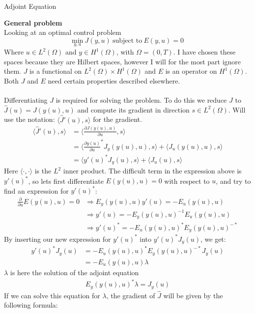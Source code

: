 \documentclass[11pt,a4paper]{report}
\begin{document}
\begin{center}

\LARGE Adjoint Equation


\end{center}
\textbf{General problem}
\\
Looking at an optimal control problem $$\underset{y,u}{\text{min}} \ J(y,u) \ \text{subject to} \ E(y,u)=0$$ Where $u \in L^2(\Omega)$ and $y \in H^1(\Omega)$, with $\Omega=(0,T)$. I have chosen these spaces because they are Hilbert spaces, however I will for the most part ignore them. $J$ is a functional on $L^2(\Omega)\times H^1(\Omega)$ and $E$ is an operator on $H^1(\Omega)$. Both $J$ and $E$ need certain properties described elsewhere.
\\
\\
Differentiating $J$ is required for solving the problem. To do this we reduce $J$ to $\hat{J}(u) = J(y(u),u) $ and compute its gradient in direction $s \in L^2(\Omega)$. Will use the notation: $\langle\hat{J}'(u),s\rangle$ for the gradient.
\begin{align*}    
\langle\hat{J}'(u),s\rangle &= \langle\frac{\partial J(y(u),u)}{\partial u},s\rangle \\ &= \langle \frac{\partial y(u)}{\partial u}^*J_y(y(u),u),s\rangle + \langle J_u(y(u),u),s\rangle \\ &= \langle y'(u)^*J_y(u),s\rangle +\langle J_u(u),s\rangle
\end{align*}
Here $\langle\cdot,\cdot\rangle$ is the $L^2$ inner product. The difficult term in the expression above is $y'(u)^*$, so lets first differentiate $E(y(u),u)=0$ with respect to $u$, and try to find an expression for $y'(u)^*$: 
\begin{align*}
\frac{\partial}{\partial u}E(y(u),u)=0 &\Rightarrow E_y(y(u),u)y'(u)=-E_u(y(u),u) \\ &\Rightarrow y'(u)=-E_y(y(u),u)^{-1}E_u(y(u),u) \\ &\Rightarrow y'(u)^* = -E_u(y(u),u)^*E_y(y(u),u)^{-*}
\end{align*} 
By inserting our new expression for $y'(u)^*$ into $y'(u)^*J_y(u)$, we get:
\begin{align*}
y'(u)^*J_y(u)&=-E_u(y(u),u)^*E_y(y(u),u)^{-*}J_y(u) \\
&=-E_u(y(u),u)\lambda
\end{align*}
$\lambda$ is here the solution of the adjoint equation 
\begin{gather*}
E_y(y(u),u)^{*}\lambda=J_y(u)
\end{gather*}
If we can solve this equation for $\lambda$, the gradient of $\hat{J}$ will be given by the following formula:  
\end{document}
